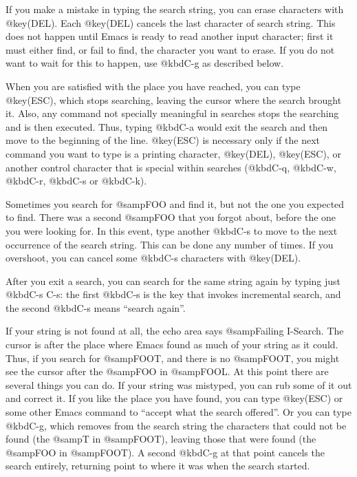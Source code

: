 {{{{{{  If you make a mistake in typing the search string, you can erase
characters with @key(DEL).  Each @key(DEL) cancels the last character
of search string.  This does not happen until Emacs is ready to read
another input character; first it must either find, or fail to find, the
character you want to erase.  If you do not want to wait for this to happen,
use @kbd{C-g} as described below.

  When you are satisfied with the place you have reached, you can type
@key(ESC), which stops searching, leaving the cursor where the search
brought it.  Also, any command not specially meaningful in searches stops
the searching and is then executed.  Thus, typing @kbd{C-a} would exit the
search and then move to the beginning of the line.  @key(ESC) is
necessary only if the next command you want to type is a printing
character, @key(DEL), @key(ESC), or another control character that is
special within searches (@kbd{C-q}, @kbd{C-w}, @kbd{C-r}, @kbd{C-s} or
@kbd{C-k}).

  Sometimes you search for @samp{FOO} and find it, but not the one you
expected to find.  There was a second @samp{FOO} that you forgot about,
before the one you were looking for.  In this event, type another @kbd{C-s}
to move to the next occurrence of the search string.  This can be done any
number of times.  If you overshoot, you can cancel some @kbd{C-s}
characters with @key(DEL).

  After you exit a search, you can search for the same string again by
typing just @kbd{C-s C-s}: the first @kbd{C-s} is the key that invokes
incremental search, and the second @kbd{C-s} means ``search again''.

  If your string is not found at all, the echo area says @samp{Failing
I-Search}.  The cursor is after the place where Emacs found as much of your
string as it could.  Thus, if you search for @samp{FOOT}, and there is no
@samp{FOOT}, you might see the cursor after the @samp{FOO} in @samp{FOOL}.
At this point there are several things you can do.  If your string was
mistyped, you can rub some of it out and correct it.  If you like the place
you have found, you can type @key(ESC) or some other Emacs command to
``accept what the search offered''.  Or you can type @kbd{C-g}, which
removes from the search string the characters that could not be found (the
@samp{T} in @samp{FOOT}), leaving those that were found (the @samp{FOO} in
@samp{FOOT}).  A second @kbd{C-g} at that point cancels the search entirely,
returning point to where it was when the search started.

}}}}}}
